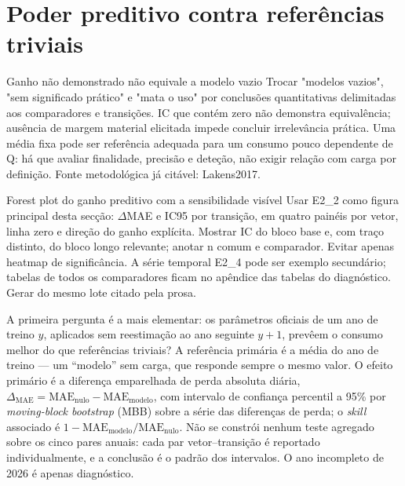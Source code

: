 \section{Poder preditivo contra referências triviais}
\label{sec:poder-preditivo}
{Ganho não demonstrado não equivale a modelo vazio}
{Trocar "modelos vazios", "sem significado prático" e "mata o uso" por
conclusões quantitativas delimitadas aos comparadores e transições.
IC que contém zero não demonstra equivalência; ausência de margem
material elicitada impede concluir irrelevância prática. Uma média fixa
pode ser referência adequada para um consumo pouco dependente de Q:
há que avaliar finalidade, precisão e deteção, não exigir relação com
carga por definição. Fonte metodológica já citável: Lakens2017.}%

{Forest plot do ganho preditivo com a sensibilidade visível}
{Usar E2\_2 como figura principal desta secção: \ensuremath{\Delta}MAE e IC95 por transição,
em quatro painéis por vetor, linha zero e direção do ganho explícita.
Mostrar IC do bloco base e, com traço distinto, do bloco longo relevante;
anotar n comum e comparador. Evitar apenas heatmap de significância.
A série temporal E2\_4 pode ser exemplo secundário; tabelas de todos os
comparadores ficam no apêndice das tabelas do diagnóstico. Gerar do mesmo lote citado pela prosa.}%

A primeira pergunta é a mais elementar: os parâmetros oficiais
de um ano de treino $y$, aplicados sem reestimação ao ano seguinte $y{+}1$,
prevêem o consumo melhor do que referências triviais? A referência primária é
a média do ano de treino --- um ``modelo'' sem carga, que responde sempre o
mesmo valor. O efeito primário é a diferença emparelhada de perda absoluta
diária, $\Delta_{\mathrm{MAE}} = \mathrm{MAE}_{\mathrm{nulo}} -
\mathrm{MAE}_{\mathrm{modelo}}$, com intervalo de confiança percentil a 95\%
por \emph{moving-block bootstrap} (MBB) sobre a série das diferenças de
perda; o \emph{skill} associado é
$1 - \mathrm{MAE}_{\mathrm{modelo}}/\mathrm{MAE}_{\mathrm{nulo}}$. Não se
constrói nenhum teste agregado sobre os cinco pares anuais: cada par
vetor--transição é reportado individualmente, e a conclusão é o padrão dos
intervalos. O ano incompleto de 2026 é apenas diagnóstico.

